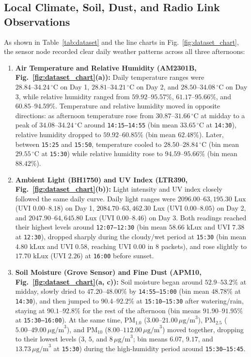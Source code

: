 \documentclass[conference,onecolumn]{IEEEtran}
\begin{document}
\subsection{Local Climate, Soil, Dust, and Radio Link Observations}
As shown in Table~\ref{tab:dataset} and the line charts in Fig.~\ref{fig:dataset_chart}, the sensor node recorded clear daily weather patterns across all three afternoons:
\begin{enumerate}
    \item \textbf{Air Temperature and Relative Humidity (AM2301B, Fig.~\ref{fig:dataset_chart}(a)):} Daily temperature ranges were $28.84\text{--}34.24\,^\circ\text{C}$ on Day 1, $28.81\text{--}34.21\,^\circ\text{C}$ on Day 2, and $28.50\text{--}34.08\,^\circ\text{C}$ on Day 3, while relative humidity ranged from $59.92\text{--}95.57\%$, $61.17\text{--}95.66\%$, and $60.85\text{--}94.59\%$. Temperature and relative humidity moved in opposite directions: as afternoon temperature rose from $30.87\text{--}31.66\,^\circ\text{C}$ at midday to a peak of $34.08\text{--}34.24\,^\circ\text{C}$ around \texttt{14:15--14:55} (bin mean $33.65\,^\circ\text{C}$ at \texttt{14:30}), relative humidity dropped to $59.92\text{--}60.85\%$ (bin mean $62.48\%$). Later, between \texttt{15:25} and \texttt{15:50}, temperature cooled to $28.50\text{--}28.84\,^\circ\text{C}$ (bin mean $29.55\,^\circ\text{C}$ at \texttt{15:30}) while relative humidity rose to $94.59\text{--}95.66\%$ (bin mean $88.42\%$).
    \item \textbf{Ambient Light (BH1750) and UV Index (LTR390, Fig.~\ref{fig:dataset_chart}(b)):} Light intensity and UV index closely followed the same daily curve. Daily light ranges were $2096.00\text{--}63,195.30\text{ Lux}$ (UVI $0.00\text{--}8.18$) on Day 1, $2084.70\text{--}63,462.30\text{ Lux}$ (UVI $0.00\text{--}8.05$) on Day 2, and $2047.90\text{--}64,645.80\text{ Lux}$ (UVI $0.00\text{--}8.46$) on Day 3. Both readings reached their highest levels around \texttt{12:07--12:30} (bin mean $58.66\text{ kLux}$ and UVI $7.38$ at \texttt{12:30}), dropped sharply during the cloudy/wet period at \texttt{15:30} (bin mean $4.80\text{ kLux}$ and UVI $0.58$, reaching UVI $0.00$ in 8 packets), and rose slightly to $17.70\text{ kLux}$ (UVI $2.26$) at \texttt{16:00} before sunset.
    \item \textbf{Soil Moisture (Grove Sensor) and Fine Dust (APM10, Fig.~\ref{fig:dataset_chart}(a, c)):} Soil moisture began around $52.9\text{--}53.2\%$ at midday, slowly dried to $47.20\text{--}48.00\%$ by \texttt{14:55--15:00} (bin mean $48.78\%$ at \texttt{14:30}), and then jumped to $90.4\text{--}92.2\%$ at \texttt{15:10--15:30} after watering/rain, staying at $90.1\text{--}92.8\%$ for the rest of the afternoon (bin means $91.90\text{--}91.95\%$ at \texttt{15:30--16:00}). At the same time, $\text{PM}_{1.0}$ ($3.00\text{--}21.00\,\mu\text{g/m}^3$), $\text{PM}_{2.5}$ ($5.00\text{--}49.00\,\mu\text{g/m}^3$), and $\text{PM}_{10}$ ($8.00\text{--}112.00\,\mu\text{g/m}^3$) moved together, dropping to their lowest levels ($3$, $5$, and $8\,\mu\text{g/m}^3$; bin means $6.07$, $9.17$, and $13.73\,\mu\text{g/m}^3$ at \texttt{15:30}) during the high-humidity period around \texttt{15:30--15:45}.

\end{enumerate}
\end{document}

